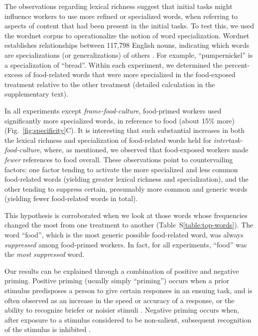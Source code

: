 \documentclass[12pt]{article}
\begin{document}
The observations regarding lexical richness suggest that 
initial tasks might influence workers to use more refined or specialized 
words, when referring to aspects of content that had been present in the 
initial tasks.  
To test this, we used the wordnet corpus to operationalize the 
notion of word specialization.  Wordnet establishes relationships between
117,798 English nouns, indicating which words are specializations
(or generalizations) of others \cite{felbaum1998wordnet}. 
For example, ``pumpernickel'' is a specialization of ``bread''.
Within each experiment, we determined the percent-excess of food-related
words that were more specialized in the food-exposed treatment relative
to the other treatment (detailed calculation in the supplementary text). 

In all experiments except \textit{frame-food-culture}, food-primed workers 
used significantly more specialized words, in reference to food 
(about 15\% more) (Fig.~\ref{fig:specificity}C).
It is interesting that such substantial increases in both the lexical 
richness and specialization of food-related words 
held for \textit{intertask-food-culture}, where, as mentioned, we observed 
that food-exposed workers made \textit{fewer} references to food overall. 
These observations point 
to countervailing factors: one factor tending to activate the more 
specialized and less common food-related words 
(yielding greater lexical richness and specialization), and the other tending 
to suppress certain, presumably more common and generic words 
(yielding fewer food-related words in total).

This hypothesis is corroborated when we look at those words whose 
frequencies changed the most from one treatment to another 
(Table~S\ref{table:top-words}).  
The word ``food'', which is the most generic possible food-related word, was 
always \textit{suppressed} among food-primed workers.  In fact, 
for all experiments, ``food'' was the \textit{most suppressed} word.

Our results can be 
explained through a combination of positive and negative priming.
Positive priming (usually simply ``priming'') occurs when a prior stimulus 
predisposes a person to give certain responses in an ensuing task, and
is often observed as an increase in the speed or accuracy of a response, or
the ability to recognize briefer or noisier stimuli 
\cite{BJOP1796,BJOP1826,Huber2008324}.
Negative priming occurs when, after exposure to a stimulus 
considered to be non-salient, subsequent recognition of the stimulus is 
inhibited \cite{mayr2007negative}.
\end{document}
